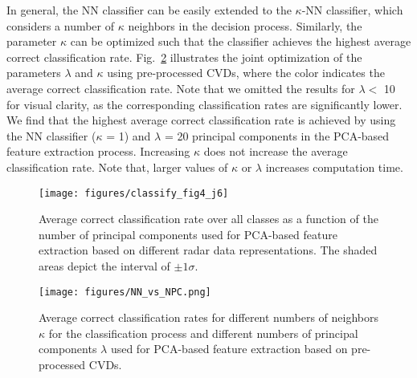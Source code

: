 In general, the NN classifier can be easily extended to the $\kappa$-NN classifier, which considers a number of $\kappa$ neighbors in the decision process. Similarly, the parameter $\kappa$ can be optimized such that the classifier achieves the highest average correct classification rate. Fig.~\ref{fig:kappa_vs_lambda} illustrates the joint optimization of the parameters $\lambda$ and $\kappa$ using pre-processed CVDs, where the color indicates the average correct classification rate. Note that we omitted the results for $\lambda <$ 10 for visual clarity, as the corresponding classification rates are significantly lower. We find that the highest average correct classification rate is achieved by using the NN classifier ($\kappa$ = 1) and $\lambda$ = 20 principal components in the PCA-based feature extraction process. Increasing $\kappa$ does not increase the average classification rate. Note that, larger values of $\kappa$ or $\lambda$ increases computation time.

\begin{figure}[!t]
	\centering
	\texttt{[image: figures/classify\_fig4\_j6]}
	\caption{Average correct classification rate over all classes as a function of the number of principal components used for PCA-based feature extraction based on different radar data representations. The shaded areas depict the interval of $\pm1\sigma$. \label{fig:parapet}}
	\vspace{-0.5em}
\end{figure}

\begin{figure}[!t]
	\centering
	\vspace{-0.5em}
	\texttt{[image: figures/NN\_vs\_NPC.png]}
	\caption{Average correct classification rates for different numbers of neighbors $\kappa$ for the classification process and different numbers of principal components $\lambda$ used for PCA-based feature extraction based on pre-processed CVDs. \label{fig:kappa_vs_lambda}}
	\vspace{-0.5em}
\end{figure}

